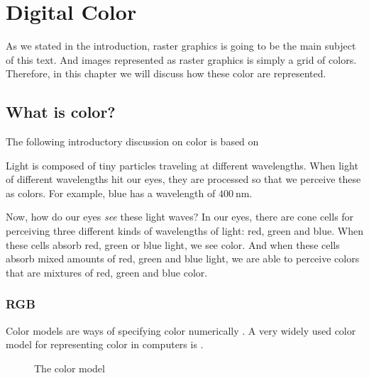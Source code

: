 \begin{comment}
  
\end{comment}

\chapter{Digital Color}
\label{cha:color}

As we stated in the introduction, raster graphics is going to be the
main subject of this text. And images represented as raster graphics
is simply a grid of colors. Therefore, in this chapter we will discuss
how these color are represented.

\section{What is color?}

The following introductory discussion on color is based on
\cite{neider93:_openg_progr_guide,ohlsson99:_digit_bild_kreat,schanda97:_colorimetry,Cotton95colour,Pascale2003_ReviewRGBColourSpaces}

\newcommand{\bluewave}{\ensuremath{\SI{400}{\nano\meter}}}

Light is composed of tiny particles traveling at different
wavelengths. When light of different wavelengths hit our eyes, they
are processed so that we perceive these as colors. For example, blue
has a wavelength of \bluewave.

Now, how do our eyes \textit{see} these light waves? In our eyes,
there are cone cells for perceiving three different kinds of
wavelengths of light: red, green and blue. When these cells absorb
red, green or blue light, we see color. And when these cells absorb
mixed amounts of red, green and blue light, we are able to perceive
colors that are mixtures of red, green and blue color.

\subsection{RGB}
\label{sec:rgb}

Color models are ways of specifying color numerically
\cite{hearn1997computer_graphics,Pascale2003_ReviewRGBColourSpaces}. A
very widely used color model for representing color in computers is
\rgb.

\begin{figure}
  \centering
  \caption{The \rgb color model}
  \label{fig:rgb}
\end{figure}


